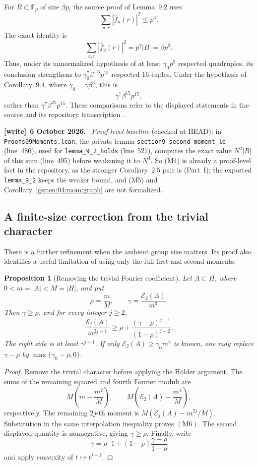 \documentclass[11pt,letterpaper]{article}
\numberwithin{equation}{section}
\newtheorem{proposition}[theorem]{Proposition}
\theoremstyle{definition}
\theoremstyle{remark}
\newcommand{\F}{\mathbb F}
\newcommand{\1}{\mathbf 1}
\newcommand{\abs}[1]{\left|#1\right|}
\newcommand{\file}[1]{\nolinkurl{#1}}
\newenvironment{writenote}[1][]{\par\smallskip\begingroup\small
 \noindent\textbf{[write]}\if\relax\detokenize{#1}\relax\else~\textbf{#1.}\fi\ }%
 {\par\endgroup\smallskip}
\begin{document}
For \(B\subset\F_p\) of size \(\beta p\), the source proof of
Lemma~9.2 uses
\[
 \sum_{u,r}\abs{\widehat f_u(r)}^2\leq p^3.
\]
The exact identity is
\[
 \sum_{u,r}\abs{\widehat f_u(r)}^2
       =p^2\abs B=\beta p^3.
 \tag{M4}
\]
Thus, under its unnormalized hypothesis of at least
\(\gamma_0p^3\) respected quadruples, its conclusion strengthens to
\(\gamma_0^7\beta^{-6}p^{15}\) respected \(16\)-tuples.
Under the hypothesis of Corollary~9.4, where
\(\gamma_0=\gamma\beta^3\), this is
\[
 \gamma^7\beta^{15}p^{15},
 \tag{M5}
\]
rather than \(\gamma^7\beta^{21}p^{15}\).
These comparisons refer to the displayed statements in the source
and its repository transcription \cite{gowers,repo04}.
\begin{writenote}[6 October 2026]
\emph{Proof-level baseline} (checked at HEAD): in \file{Proofs09Moments.lean}, the private lemma \file{section9_second_moment_le} (line~480), used for \file{lemma_9_2_holds} (line~527), computes the exact value $N^2|B|$ of this sum (line~495) before weakening it to $N^3$. So (M4) is already a proof-level fact in the repository, as the stronger Corollary~2.5 pair is (Part~I); the exported \file{lemma_9_2} keeps the weaker bound, and (M5) and Corollary~\ref{gsr:en:04:mom:graph} are not formalized.
\end{writenote}

\subsection{A finite-size correction from the trivial character}

There is a further refinement when the ambient group size matters.
Its proof also identifies a useful limitation of using only the
full first and second moments.

\begin{proposition}[Removing the trivial Fourier coefficient]
\label{gsr:en:04:mom:residual}
Let \(A\subset H\), where \(0<m=\abs A<M=\abs H\), and put
\[
 \rho=\frac mM,\qquad
 \gamma=\frac{\mathcal E_2(A)}{m^3}.
\]
Then \(\gamma\geq\rho\), and for every integer \(j\geq2\),
\[
 \frac{\mathcal E_j(A)}{m^{2j-1}}
 \geq
 \rho+\frac{(\gamma-\rho)^{j-1}}{(1-\rho)^{j-2}}.
 \tag{M6}
\]
The right side is at least \(\gamma^{j-1}\).  If only
\(\mathcal E_2(A)\geq\gamma_0m^3\) is known, one may replace
\(\gamma-\rho\) by \(\max\{\gamma_0-\rho,0\}\).
\end{proposition}

\begin{proof}
Remove the trivial character before applying the H\"older argument.
The sums of the remaining squared and fourth Fourier moduli are
\[
 M\left(m-\frac{m^2}{M}\right),
 \qquad
 M\left(\mathcal E_2(A)-\frac{m^4}{M}\right),
\]
respectively.  The remaining \(2j\)-th moment is
\(M(\mathcal E_j(A)-m^{2j}/M)\).  Substitution in the same
interpolation inequality proves \(\mathrm{(M6)}\).
The second displayed quantity is nonnegative, giving
\(\gamma\geq\rho\).  Finally, write
\[
 \gamma=\rho\cdot1+(1-\rho)
                     \frac{\gamma-\rho}{1-\rho}
\]
and apply convexity of \(t\mapsto t^{j-1}\).
\end{proof}
\end{document}
